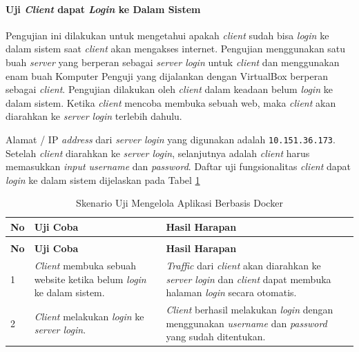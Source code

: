 \paragraph{Uji \textit{Client} dapat \textit{Login} ke Dalam Sistem} \label{pertama}
Pengujian ini dilakukan untuk mengetahui apakah \textit{client} sudah bisa \textit{login} ke dalam sistem saat \textit{client} akan mengakses internet. Pengujian menggunakan satu buah \textit{server} yang berperan sebagai \textit{server login} untuk \textit{client} dan menggunakan enam buah Komputer Penguji yang dijalankan dengan VirtualBox berperan sebagai \textit{client}. Pengujian dilakukan oleh \textit{client} dalam keadaan belum \textit{login} ke dalam sistem. Ketika \textit{client} mencoba membuka sebuah web, maka \textit{client} akan diarahkan ke \textit{server login} terlebih dahulu.

Alamat / IP \textit{address} dari \textit{server login} yang digunakan adalah \texttt{10.151.36.173}. Setelah \textit{client} diarahkan ke \textit{server login}, selanjutnya adalah \textit{client} harus memasukkan \textit{input username} dan \textit{password}. Daftar uji fungsionalitas \textit{client} dapat \textit{login} ke dalam sistem dijelaskan pada Tabel \ref{ujicoba1}

\begin{longtable}{|p{}|p{}|p{}|}					\caption{Skenario Uji \textit{Client} dapat \textit{Login} ke Dalam Sistem} \label{ujicoba1} \\
	\hline
	\textbf{No} & \textbf{Uji Coba} & \textbf{Hasil Harapan} \\ \hline
	\endfirsthead
	\caption[]{Skenario Uji Mengelola Aplikasi Berbasis Docker} \\
	\hline
	\textbf{No} & \textbf{Uji Coba} & \textbf{Hasil Harapan} \\ \hline
	\endhead
	\endfoot
	\endlastfoot
	
	1 & \textit{Client} membuka sebuah website ketika belum \textit{login} ke dalam sistem. & \textit{Traffic} dari \textit{client} akan diarahkan ke \textit{server login} dan \textit{client} dapat membuka halaman \textit{login} secara otomatis.\\ \hline
	2 & \textit{Client} melakukan \textit{login} ke \textit{server login}. & \textit{Client} berhasil melakukan \textit{login} dengan menggunakan \textit{username} dan \textit{password} yang sudah ditentukan.\\ \hline
\end{longtable}

